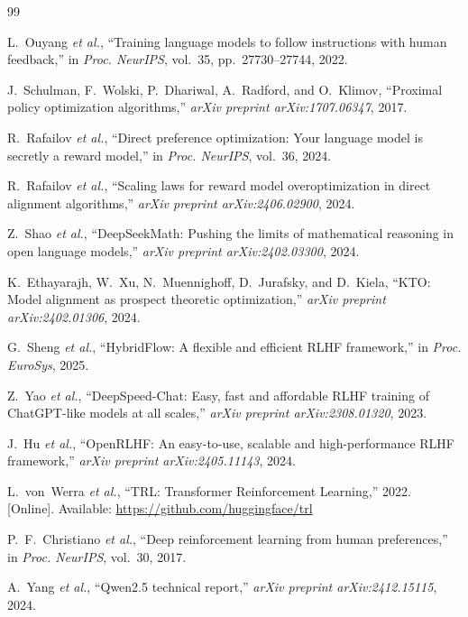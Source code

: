 \documentclass{ieeeaccess}
\begin{document}
\begin{thebibliography}{99}

L.~Ouyang \emph{et al.}, ``Training language models to follow instructions with human feedback,''
in \emph{Proc. NeurIPS}, vol.~35, pp.~27730--27744, 2022.

J.~Schulman, F.~Wolski, P.~Dhariwal, A.~Radford, and O.~Klimov,
``Proximal policy optimization algorithms,''
\emph{arXiv preprint arXiv:1707.06347}, 2017.

R.~Rafailov \emph{et al.},
``Direct preference optimization: Your language model is secretly a reward model,''
in \emph{Proc. NeurIPS}, vol.~36, 2024.


R.~Rafailov \emph{et al.},
``Scaling laws for reward model overoptimization in direct alignment algorithms,''
\emph{arXiv preprint arXiv:2406.02900}, 2024.

Z.~Shao \emph{et al.},
``DeepSeekMath: Pushing the limits of mathematical reasoning in open language models,''
\emph{arXiv preprint arXiv:2402.03300}, 2024.

K.~Ethayarajh, W.~Xu, N.~Muennighoff, D.~Jurafsky, and D.~Kiela,
``KTO: Model alignment as prospect theoretic optimization,''
\emph{arXiv preprint arXiv:2402.01306}, 2024.

G.~Sheng \emph{et al.},
``HybridFlow: A flexible and efficient RLHF framework,''
in \emph{Proc. EuroSys}, 2025.

Z.~Yao \emph{et al.},
``DeepSpeed-Chat: Easy, fast and affordable RLHF training of ChatGPT-like models at all scales,''
\emph{arXiv preprint arXiv:2308.01320}, 2023.

J.~Hu \emph{et al.},
``OpenRLHF: An easy-to-use, scalable and high-performance RLHF framework,''
\emph{arXiv preprint arXiv:2405.11143}, 2024.

L.~von~Werra \emph{et al.},
``TRL: Transformer Reinforcement Learning,'' 2022.
[Online]. Available: \url{https://github.com/huggingface/trl}

P.~F.~Christiano \emph{et al.},
``Deep reinforcement learning from human preferences,''
in \emph{Proc. NeurIPS}, vol.~30, 2017.

A.~Yang \emph{et al.},
``Qwen2.5 technical report,''
\emph{arXiv preprint arXiv:2412.15115}, 2024.


\end{thebibliography}
\end{document}
